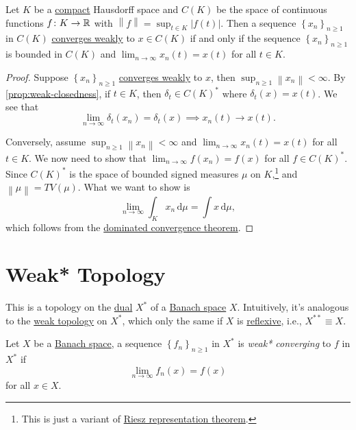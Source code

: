 \begin{theorem}\label{thm:weak-convergence-in-CK}
	Let \(K\) be a \hyperref[def:compact]{compact} Hausdorff space and \(C(K)\) be the space of continuous functions \(f\colon K\to \mathbb{\MakeUppercase{r}} \) with \(\left\lVert f\right\rVert = \sup _{t\in K} \left\vert f(t) \right\vert \). Then a sequence \(\left\{ x_n \right\}_{n \geq 1} \) in \(C(K)\) \hyperref[def:weakly-convergence]{converges weakly} to \(x\in C(K)\)  if and only if the sequence \(\left\{ x_n \right\} _{n\geq 1}\) is bounded in \(C(K)\) and \(\lim_{n \to \infty} x_n(t)=x(t)\) for all \(t\in K\).
\end{theorem}
\begin{proof}
	Suppose \(\left\{ x_n \right\} _{n \geq 1}\) \hyperref[def:weakly-convergence]{converges weakly} to \(x\), then \(\sup _{n\geq 1} \left\lVert x_n\right\rVert < \infty \). By \autoref{prop:weak-closedness}, if \(t\in K\), then \(\delta _t\in C(K)^{\ast} \) where \(\delta _t(x) = x(t)\). We see that
	\[
		\lim_{n \to \infty} \delta _t(x_n) = \delta _t(x)\implies x_n(t) \to x(t).
	\]

	Conversely, assume \(\sup _{n\geq 1}\left\lVert x_n\right\rVert < \infty \) and \(\lim_{n \to \infty} x_n(t) = x(t)\) for all \(t\in K\). We now need to show that \(\lim_{n \to \infty} f(x_{n} ) = f(x)\) for all \(f\in C(K)^{\ast} \). Since \(C(K)^{\ast} \) is the space of bounded signed measures \(\mu \) on \(K\),\footnote{This is just a variant of \hyperref[thm:Riesz-representation]{Riesz representation theorem}.} and \(\left\lVert \mu \right\rVert = TV(\mu )\). What we want to show is
	\[
		\lim_{n \to \infty} \int _K x_n \,\mathrm{d} \mu = \int x \,\mathrm{d} \mu,
	\]
	which follows from the \href{https://en.wikipedia.org/wiki/Dominated_convergence_theorem}{dominated convergence theorem}.
\end{proof}

\section{Weak* Topology}
This is a topology on the \hyperref[def:dual-space]{dual} \(X^{\ast} \) of a \hyperref[def:Banach-space]{Banach space} \(X\). Intuitively, it's analogous to the \hyperref[def:weak-topology]{weak topology} on \(X^{\ast} \), which only the same if \(X\) is \hyperref[def:reflexive-space]{reflexive}, i.e., \(X^{\ast\ast} \equiv X\).

\begin{definition}\label{def:weak*-convergence}
	Let \(X\) be a \hyperref[def:Banach-space]{Banach space}, a sequence \(\left\{ f_{n} \right\}_{n\geq 1} \) in \(X^{\ast} \) is \emph{weak* converging} to \(f\) in \(X^{\ast}\) if
	\[
		\lim_{n \to \infty} f_n(x) = f(x)
	\]
	for all \(x\in X\).
\end{definition}

